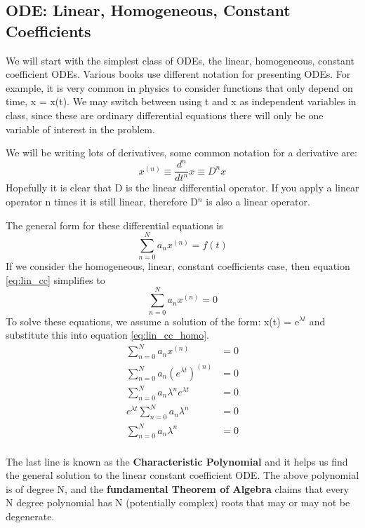 \documentclass{article}
\newcommand{\be}{\begin{equation}}
\newcommand{\ee}{\end{equation}}
\begin{document}
\subsection*{ODE: Linear, Homogeneous, Constant Coefficients}
We will start with the simplest class of ODEs, the linear, homogeneous, constant coefficient ODEs.
Various books use different notation for presenting ODEs.
For example, it is very common in physics to consider functions that only depend on time, x = x(t).
We may switch between using t and x as independent variables in class, since these are ordinary differential equations there will only be one variable of interest in the problem.

We will be writing lots of derivatives, some common notation for a derivative are:
\be
x^{(n)} \equiv \frac{d^n}{dt^n}x \equiv D^n x
\ee
Hopefully it is clear that D is the linear differential operator.
If you apply a linear operator n times it is still linear, therefore D$^n$ is also a linear operator.

The general form for these differential equations is
\be \label{eq:lin_cc}
\sum_{n=0}^N a_nx^{(n)} = f(t)
\ee
If we consider the homogeneous, linear, constant coefficients case, then equation \ref{eq:lin_cc} simplifies to
\be \label{eq:lin_cc_homo}
\sum_{n=0}^N a_nx^{(n)} = 0
\ee
To solve these equations, we assume a solution of the form: x(t) = e$^{\lambda t}$ and substitute this into equation \ref{eq:lin_cc_homo}.
\be
\begin{split}
    \sum_{n=0}^N a_nx^{(n)} &= 0\\
    \sum_{n=0}^N a_n \left(e^{\lambda t}\right) ^{(n)} &= 0\\
    \sum_{n=0}^N a_n \lambda^n e^{\lambda t} &= 0\\
    e^{\lambda t} \sum_{n=0}^N a_n \lambda^n &= 0\\
    \sum_{n=0}^N a_n \lambda^n &= 0\\
\end{split}
\ee

The last line is known as the \textbf{Characteristic Polynomial} and it helps us find the general solution to the linear constant coefficient ODE.
The above polynomial is of degree N, and the \textbf{fundamental Theorem of Algebra} claims that every N degree polynomial has N (potentially complex) roots that may or may not be degenerate.
\end{document}

